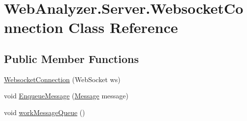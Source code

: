 \hypertarget{class_web_analyzer_1_1_server_1_1_websocket_connection}{}\section{Web\+Analyzer.\+Server.\+Websocket\+Connection Class Reference}
\label{class_web_analyzer_1_1_server_1_1_websocket_connection}
\subsection*{Public Member Functions}
\begin{DoxyCompactItemize}
\item 
\hyperlink{class_web_analyzer_1_1_server_1_1_websocket_connection_af4ada0b7f2d032ad42da1d9238619ebd}{Websocket\+Connection} (Web\+Socket ws)
\item 
void \hyperlink{class_web_analyzer_1_1_server_1_1_websocket_connection_a0450a1a608d5dcb62bddfe2a75aee305}{Enqueue\+Message} (\hyperlink{class_web_analyzer_1_1_models_1_1_message_model_1_1_message}{Message} message)
\item 
void \hyperlink{class_web_analyzer_1_1_server_1_1_websocket_connection_a325a5138c2af5d5296360cf0abdd1942}{work\+Message\+Queue} ()
\end{DoxyCompactItemize}
